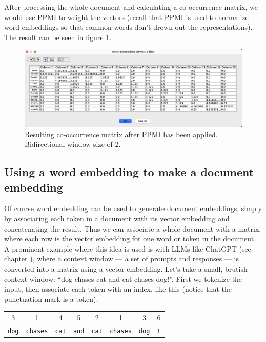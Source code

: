 After processing the whole document and calculating a co-occurrence matrix, we would use PPMI to weight the vectors (recall that PPMI is used to normalize word embeddings so that common words don't drown out the representations). The result can be seen in figure \ref{ppmiExample}.

\begin{figure}[h]
    \centering
    \includegraphics[scale=0.4]{./images/weighted_cooc_matrix.png}
    \caption[Generated using Simbrain.]{Resulting co-occurrence matrix after PPMI has been applied. Bidirectional window size of 2.}
 \label{ppmiExample}
\end{figure}

\subsection{Using a word embedding to make a document embedding}\label{wordEmbeddingMatrix}

Of course word embedding can be used to generate document embeddings, simply by associating each token in a document with its vector embedding and concatenating the result. Thus we can associate a whole document with a matrix, where each row is the vector embedding for one word or token in the document. A prominent example where this idea is used is with LLMs like ChatGPT (see chapter ), where a context window --- a set of prompts and responses --- is converted into a matrix using a vector embedding. Let's take a small, brutish context window:  ``dog chases cat and cat chases dog!''.  First we tokenize the input, then associate each token with an index, like this (notice that the punctuation mark is a token):

\begin{center}
\begin{tabular}{c@{}c@{}c@{}c@{}c@{}c@{}c@{}c}
   3 & 1 & 4 & 5 & 2 & 1 & 3 & \hspace{0.5cm}6 \\
   \texttt{dog} & \texttt{\quad chases} & \texttt{\quad cat} & \texttt{\quad and} & \texttt{\quad cat} & \texttt{\quad chases} & \texttt{\quad dog} & \texttt{\quad !} \\
\end{tabular}
\end{center}

